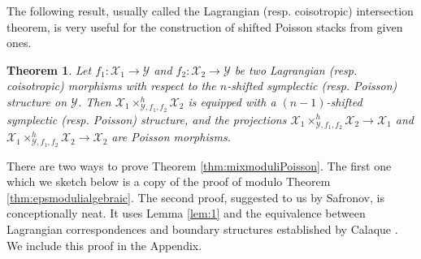 \documentclass[reqno]{amsart}
\newtheorem{theorem}{Theorem}[section]
\theoremstyle{definition}
\theoremstyle{remark}
\newcommand{\sX}{\mathscr{X}}
\newcommand{\sY}{\mathscr{Y}}
\numberwithin{equation}{section}
\begin{document}
The following result, usually called the Lagrangian (resp. coisotropic) intersection theorem, is very useful for the construction of shifted Poisson stacks from given ones.
\begin{theorem}\cite[Theorem 2.9]{PTVV}\cite[Theorem 3.6]{MS2}\label{thm:fiberprod}
Let $f_1: \sX_1\to \sY$ and $f_2: \sX_2\to \sY$ be two Lagrangian (resp. coisotropic) morphisms with respect to the $n$-shifted symplectic (resp. Poisson) structure on $\sY$.  Then  $\sX_1\times^h_{\sY,f_1,f_2}\sX_2$ is equipped with a $(n-1)$-shifted symplectic (resp. Poisson) structure, and the projections $\sX_1\times^h_{\sY,f_1,f_2}\sX_2\to \sX_1$ and $\sX_1\times^h_{\sY,f_1,f_2}\sX_2\to \sX_2$ are Poisson morphisms.
\end{theorem}



There are two ways to prove Theorem \ref{thm:mixmoduliPoisson}. The first one which we sketch below is a copy of the proof of \cite[Theorem 3.13]{HP1}
 modulo Theorem \ref{thm:epsmodulialgebraic}. The second proof, suggested to us by Safronov, is conceptionally neat. It uses Lemma \ref{lem:1} and the equivalence between Lagrangian correspondences and boundary structures established by Calaque \cite{Ca14}. We include this proof in the Appendix.
\end{document}
